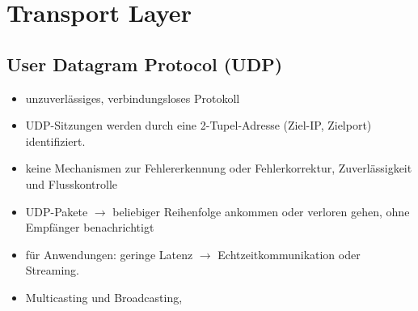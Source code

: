 
\section{Transport Layer}


\subsection{User Datagram Protocol (UDP)}
{
    \begin{itemize}[noitemsep]
        \item unzuverlässiges, verbindungsloses Protokoll
        \item UDP-Sitzungen werden durch eine 2-Tupel-Adresse (Ziel-IP, Zielport) identifiziert.
        \item  keine Mechanismen zur Fehlererkennung oder Fehlerkorrektur, Zuverlässigkeit und Flusskontrolle
        \item UDP-Pakete $\to$ beliebiger Reihenfolge ankommen oder verloren gehen, ohne  Empfänger benachrichtigt
        \item für Anwendungen:  geringe Latenz $\to$ Echtzeitkommunikation oder Streaming.
        \item Multicasting und Broadcasting,
    \end{itemize}

}

